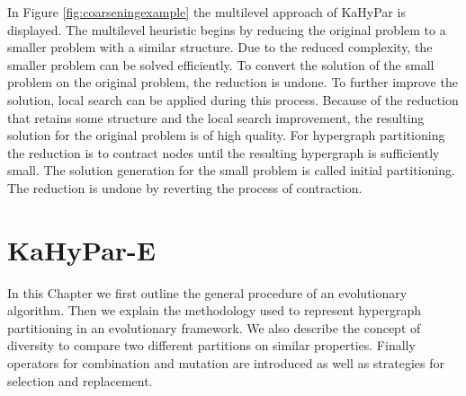\documentclass[a4paper,12pt,titlepage, BCOR7mm,headsepline]{scrbook}
\numberwithin{equation}{section}
\begin{document}
In Figure \ref{fig:coarseningexample} the multilevel approach of KaHyPar is displayed. The multilevel heuristic \cite{bulucc2016recent} begins by reducing the original problem to a smaller problem with a similar structure. Due to the reduced complexity, the smaller problem can be solved efficiently. To convert the solution of the small problem on the original problem, the reduction is undone. To further improve the solution, local search can be applied during this process. Because of the reduction that retains some structure and the local search improvement, the resulting solution for the original problem is of high quality. For hypergraph partitioning the reduction is to contract nodes until the resulting hypergraph is sufficiently small. The solution generation for the small problem is called initial partitioning. The reduction is undone by reverting the process of contraction.


\chapter{KaHyPar-E}
\label{chapter:kahypare}
In this Chapter we first outline the general procedure of an evolutionary algorithm. Then we explain the methodology used to represent hypergraph partitioning in an evolutionary framework. We also describe the concept of diversity to compare two different partitions on similar properties. Finally operators for combination and mutation are introduced as well as strategies for selection and replacement.
\end{document}
